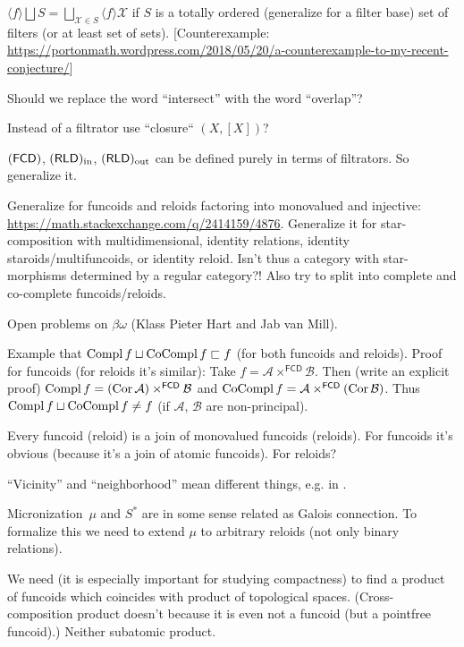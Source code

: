 \documentclass{amsart}
\begin{document}
\begin{conjecture}
$\langle f \rangle \bigsqcup S = \bigsqcup_{\mathcal{X} \in S} \langle f
\rangle \mathcal{X}$ if $S$ is a totally ordered (generalize for a filter
base) set of filters (or at least set of sets).
[Counterexample: \url{https://portonmath.wordpress.com/2018/05/20/a-counterexample-to-my-recent-conjecture/}]
\end{conjecture}

Should we replace the word ``intersect'' with the word ``overlap''?

Instead of a filtrator use ``closure`` $(X,[X])$?

$(\mathsf{FCD})$, $(\mathsf{RLD})_{\mathrm{in}}$, $(\mathsf{RLD})_{\mathrm{out}}$ can be defined purely in terms of filtrators.
So generalize it.

Generalize for funcoids and reloids factoring into monovalued and injective:\\
\url{https://math.stackexchange.com/q/2414159/4876}.
Generalize it for star-composition with multidimensional, identity relations, identity staroids/multifuncoids, or identity reloid.
Isn't thus a category with star-morphisms determined by a regular category?!
Also try to split into complete and co-complete funcoids/reloids.

Open problems on $\beta\omega$ (Klass Pieter Hart and Jab van Mill).

Example that $\operatorname{Compl} f\sqcup\operatorname{CoCompl} f\sqsubset f$ (for both funcoids and reloids).
Proof for funcoids (for reloids it's similar): Take $f=\mathcal{A}\times^{\mathsf{FCD}}\mathcal{B}$. Then (write an explicit proof)
$\operatorname{Compl} f=(\operatorname{Cor}\mathcal{A})\times^{\mathsf{FCD}}\mathcal{B}$ and $\operatorname{CoCompl} f=\mathcal{A}\times^{\mathsf{FCD}}(\operatorname{Cor}\mathcal{B})$.
Thus $\operatorname{Compl} f\sqcup\operatorname{CoCompl} f\ne f$ (if $\mathcal{A}$, $\mathcal{B}$ are non-principal).

Every funcoid (reloid) is a join of monovalued funcoids (reloids). For funcoids it's obvious
(because it's a join of atomic funcoids). For reloids?

``Vicinity'' and ``neighborhood'' mean different things, e.g. in \cite{converg}.

Micronization~$\mu$ and $S^\ast$ are in some sense related as Galois connection.
To formalize this we need to extend $\mu$ to arbitrary reloids (not only binary relations).

We need (it is especially important for studying compactness) to find a product of funcoids which coincides with
product of topological spaces. (Cross-composition product doesn't because it is even not a funcoid (but a pointfree funcoid).)
Neither subatomic product.
\end{document}
